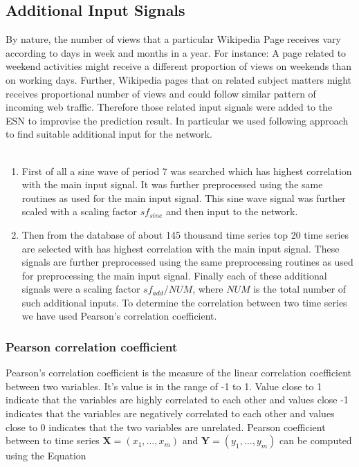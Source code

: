  \subsection{Additional Input Signals}

 
 \indent \indent
 By nature, the number of views that a particular Wikipedia Page receives vary according to  days in week and months in a year. For instance: A page related to weekend activities might receive a different proportion of views on weekends than on working days. Further, Wikipedia pages that on related subject matters might receives proportional number of views and could follow similar pattern of incoming web traffic. Therefore those related input signals were added to the ESN to improvise the prediction result. In particular we used following approach to find suitable additional input for the network. \\\\
 
 \begin{enumerate}
	 \item First of all a sine wave of period 7 was searched which has highest correlation with the main input signal. It was further preprocessed using the same routines as used for the main input signal. This sine wave signal was further scaled with a scaling factor $sf_{sine}$ and then input to the network.
	 \item Then from the database of about 145 thousand time series top 20 time series are selected with has highest correlation with the main input signal. These signals are further preprocessed using the same preprocessing routines as used for preprocessing the main input signal. Finally each of these additional signals were a scaling factor $sf_{add}/NUM$, where $NUM$ is the total number of such additional inputs. To determine the correlation between two time series we have used Pearson's correlation coefficient.
	 
 \end{enumerate}
 
 
 
 \subsubsection{Pearson correlation coefficient}
  Pearson's correlation coefficient is the measure of the linear correlation coefficient between two variables. It's value is in the range of -1 to 1. Value close to 1 indicate that the variables are highly correlated to each other and values close -1 indicates that the variables are negatively correlated to each other and values close to 0 indicates that the two variables are unrelated. Pearson coefficient between to time series $\mathbf{X} = (x_1, \hdots, x_m)$ and $\mathbf{Y} = (y_1, \hdots, y_m)$ can be computed using the Equation %
  
